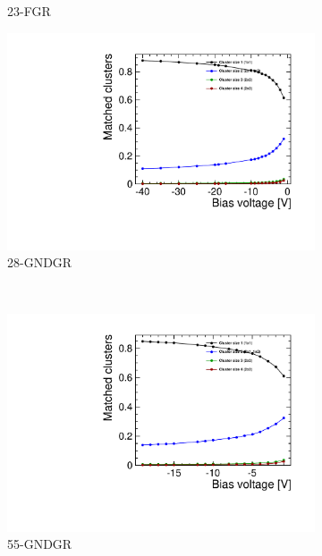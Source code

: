 \begin{figure}[htbp]
\begin{subfigure}[b]{0.33\textwidth}
    \caption{23-FGR}
  \end{subfigure}\hfill
  \begin{subfigure}[b]{0.33\textwidth}
    \includegraphics[width=\textwidth]{./figures/TestBeam/cluSize_bias_W0019_L08.pdf}
    \caption{28-GNDGR}
  \end{subfigure} \\

  \begin{subfigure}[b]{0.33\textwidth}
    \includegraphics[width=\textwidth]{./figures/TestBeam/cluSize_bias_W0019_C07.pdf}
    \caption{55-GNDGR}
  \end{subfigure} \hfill
  \begin{subfigure}[b]{0.33\textwidth}


\end{subfigure}
\end{figure}
